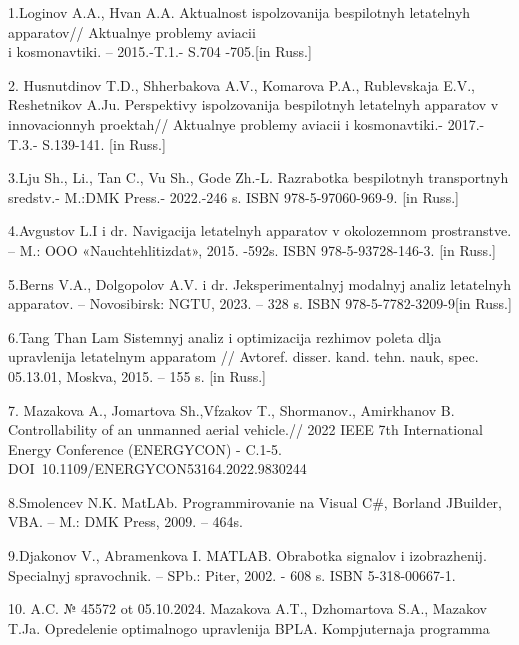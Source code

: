   
\begin{noparindent}

1.Loginov A.A., Hvan A.A. Aktual\textquotesingle nost\textquotesingle{}
ispol\textquotesingle zovanija bespilotnyh letatel\textquotesingle nyh
apparatov// Aktual\textquotesingle nye problemy aviacii \\i kosmonavtiki.
-- 2015.-T.1.- S.704 -705.{[}in Russ.{]}

2. Husnutdinov T.D., Shherbakova A.V., Komarova P.A., Rublevskaja E.V.,
Reshetnikov A.Ju. Perspektivy ispol\textquotesingle zovanija bespilotnyh
letatel\textquotesingle nyh apparatov v innovacionnyh proektah//
Aktual\textquotesingle nye problemy aviacii i kosmonavtiki.- 2017.-
T.3.- S.139-141. {[}in Russ.{]}

3.Lju Sh., Li., Tan C., Vu Sh., God\textquotesingle e Zh.-L. Razrabotka
bespilotnyh transportnyh sredstv.- M.:DMK Press.- 2022.-246 s. ISBN
978-5-97060-969-9. {[}in Russ.{]}

4.Avgustov L.I i dr. Navigacija letatel\textquotesingle nyh apparatov v
okolozemnom prostranstve. -- M.: OOO «Nauchtehlitizdat», 2015. -592s.
ISBN 978-5-93728-146-3. {[}in Russ.{]}

5.Berns V.A., Dolgopolov A.V. i dr. Jeksperimental\textquotesingle nyj
modal\textquotesingle nyj analiz letatel\textquotesingle nyh apparatov.
-- Novosibirsk: NGTU, 2023. -- 328 s. ISBN 978-5-7782-3209-9{[}in
Russ.{]}

6.Tang Than\textquotesingle{} Lam Sistemnyj analiz i optimizacija
rezhimov poleta dlja upravlenija letatel\textquotesingle nym apparatom
// Avtoref. disser. kand. tehn. nauk, spec. 05.13.01, Moskva, 2015. --
155 s. {[}in Russ.{]}

7. Mazakova A., Jomartova Sh.,Vfzakov T., Shormanov., Amirkhanov B.
Controllability of an unmanned aerial vehicle.// 2022 IEEE 7th
International Energy Conference (ENERGYCON) - C.1-5.
DOI~10.1109/ENERGYCON53164.2022.9830244

8.Smolencev N.K. MatLAb. Programmirovanie na Visual C\#, Borland
JBuilder, VBA. -- M.: DMK Press, 2009. -- 464s.

9.D\textquotesingle jakonov V., Abramenkova I. MATLAB. Obrabotka
signalov i izobrazhenij. Special\textquotesingle nyj spravochnik. --
SPb.: Piter, 2002. - 608 s. ISBN 5-318-00667-1.

10. A.C. № 45572 ot 05.10.2024. Mazakova A.T., Dzhomartova S.A., Mazakov
T.Ja. Opredelenie optimal\textquotesingle nogo upravlenija BPLA.
Komp\textquotesingle juternaja programma
\end{noparindent}
 
